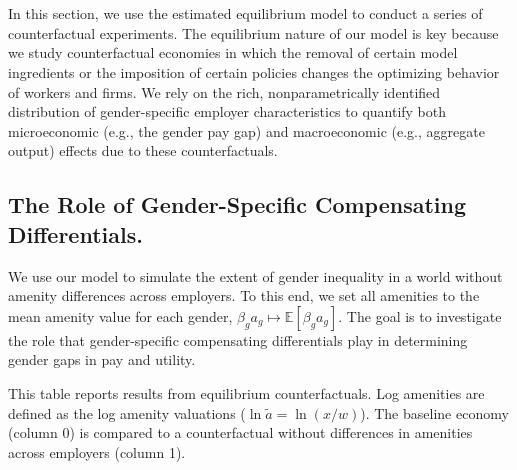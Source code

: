 

\section{{\sectioneight}\label{sec:Counterfactuals}}

In this section, we use the estimated equilibrium model to conduct a series of counterfactual experiments. The equilibrium nature of our model is key because we study counterfactual economies in which the removal of certain model ingredients or the imposition of certain policies changes the optimizing behavior of workers and firms. We rely on the rich, nonparametrically identified distribution of gender-specific employer characteristics to quantify both microeconomic (e.g., the gender pay gap) and macroeconomic (e.g., aggregate output) effects due to these counterfactuals.


\subsection{The Role of Gender-Specific Compensating Differentials.\label{subsec:decomposition}}

We use our model to simulate the extent of gender inequality in a world without amenity differences across employers. To this end, we set all amenities to the mean amenity value for each gender, $\beta_{g} a_{g} \mapsto \mathbb{E}[\beta_{g} a_{g}]$. The goal is to investigate the role that gender-specific compensating differentials \citep{Rosen1986} play in determining gender gaps in pay and utility.

%
\begin{table}[htbp!]
    \caption{Effects of eliminating firm heterogeneity in amenities}
    \label{tab:counterfactuals_table_1}
    
    \begin{tablenotes}
        \footnotesize
        This table reports results from equilibrium counterfactuals. Log amenities are defined as the log amenity valuations ($\ln \tilde{a} = \ln(x/w)$). The baseline economy (column 0) is compared to a counterfactual without differences in amenities across employers (column 1). %
    \end{tablenotes}
    \begin{tablenotes}[Source]
        \sourcemodel%
    \end{tablenotes}
\end{table}
%

